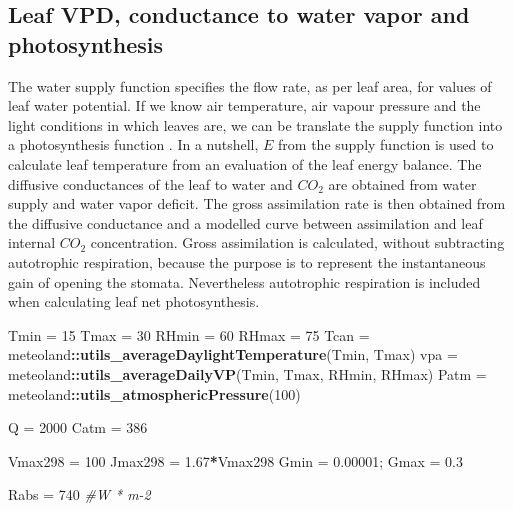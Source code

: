 \documentclass[]{book}
\newenvironment{Shaded}{\begin{snugshade}}{\end{snugshade}}
\newcommand{\KeywordTok}[1]{\textcolor[rgb]{0.13,0.29,0.53}{\textbf{#1}}}
\newcommand{\DecValTok}[1]{\textcolor[rgb]{0.00,0.00,0.81}{#1}}
\newcommand{\FloatTok}[1]{\textcolor[rgb]{0.00,0.00,0.81}{#1}}
\newcommand{\StringTok}[1]{\textcolor[rgb]{0.31,0.60,0.02}{#1}}
\newcommand{\CommentTok}[1]{\textcolor[rgb]{0.56,0.35,0.01}{\textit{#1}}}
\newcommand{\OperatorTok}[1]{\textcolor[rgb]{0.81,0.36,0.00}{\textbf{#1}}}
\newcommand{\NormalTok}[1]{#1}
\begin{document}
\subsection{Leaf VPD, conductance to water vapor and
photosynthesis}\label{leaf-vpd-conductance-to-water-vapor-and-photosynthesis}

The water supply function specifies the flow rate, as per leaf area, for
values of leaf water potential. If we know air temperature, air vapour
pressure and the light conditions in which leaves are, we can be
translate the supply function into a photosynthesis function
\citep{Sperry2016}. In a nutshell, \(E\) from the supply function is
used to calculate leaf temperature from an evaluation of the leaf energy
balance. The diffusive conductances of the leaf to water and \(CO_{2}\)
are obtained from water supply and water vapor deficit. The gross
assimilation rate is then obtained from the diffusive conductance and a
modelled curve between assimilation and leaf internal \(CO_{2}\)
concentration. Gross assimilation is calculated, without subtracting
autotrophic respiration, because the purpose is to represent the
instantaneous gain of opening the stomata. Nevertheless autotrophic
respiration is included when calculating leaf net photosynthesis.

\begin{Shaded}
\begin{Highlighting}[]
\NormalTok{Tmin =}\StringTok{ }\DecValTok{15}
\NormalTok{Tmax =}\StringTok{ }\DecValTok{30}
\NormalTok{RHmin =}\StringTok{ }\DecValTok{60}
\NormalTok{RHmax =}\StringTok{ }\DecValTok{75}
\NormalTok{Tcan =}\StringTok{ }\NormalTok{meteoland}\OperatorTok{::}\KeywordTok{utils_averageDaylightTemperature}\NormalTok{(Tmin, Tmax)}
\NormalTok{vpa =}\StringTok{ }\NormalTok{meteoland}\OperatorTok{::}\KeywordTok{utils_averageDailyVP}\NormalTok{(Tmin, Tmax, RHmin, RHmax)}
\NormalTok{Patm =}\StringTok{ }\NormalTok{meteoland}\OperatorTok{::}\KeywordTok{utils_atmosphericPressure}\NormalTok{(}\DecValTok{100}\NormalTok{)}

\NormalTok{Q =}\StringTok{ }\DecValTok{2000}
\NormalTok{Catm =}\StringTok{ }\DecValTok{386}

\NormalTok{Vmax298 =}\StringTok{ }\DecValTok{100}
\NormalTok{Jmax298 =}\StringTok{ }\FloatTok{1.67}\OperatorTok{*}\NormalTok{Vmax298}
\NormalTok{Gmin =}\StringTok{ }\FloatTok{0.00001}\NormalTok{;}
\NormalTok{Gmax =}\StringTok{ }\FloatTok{0.3}

\NormalTok{Rabs =}\StringTok{ }\DecValTok{740} \CommentTok{#W * m-2}
\end{Highlighting}
\end{Shaded}
\end{document}
